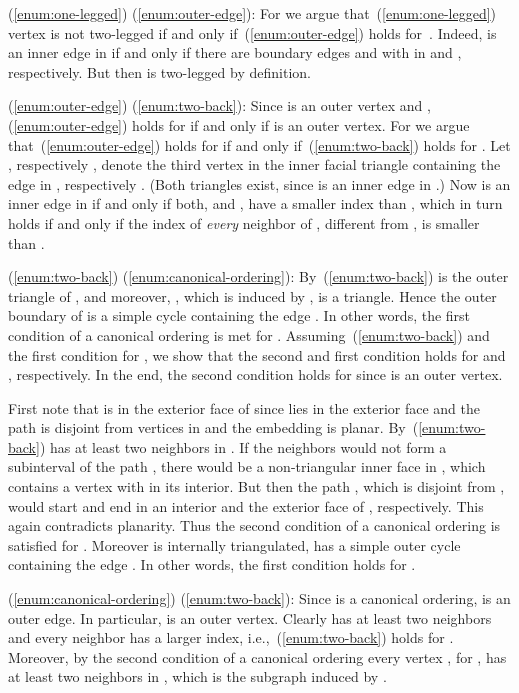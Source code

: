 \documentclass[11pt]{article}
\newenvironment{proof}{{\bf Proof:} }{\hspace*{\fill}\vspace{2mm}}
\begin{document}
\begin{proof}
  (\ref{enum:one-legged})  (\ref{enum:outer-edge}):
  For  we argue that~(\ref{enum:one-legged}) vertex 
	is not two-legged
	if and only if~(\ref{enum:outer-edge}) holds for~. Indeed,
   is an inner edge in  if and only if there are
  boundary edges  and  with  in
   and , respectively. But then 
	is two-legged by definition.

  (\ref{enum:outer-edge})  (\ref{enum:two-back}):
  Since  is an outer vertex and , (\ref{enum:outer-edge})
  holds for  if and only if  is an outer vertex. For
   we argue that~(\ref{enum:outer-edge}) holds for 
  if and only if~(\ref{enum:two-back}) holds for . Let ,
  respectively , denote the third vertex in the inner facial
  triangle containing the edge  in , respectively
  . (Both triangles exist, since  is an inner edge
  in .) Now  is an inner edge in  if and only
  if both,  and , have a smaller index than ,
  which in turn holds if and only if the index of \emph{every}
  neighbor of , different from , is smaller than .

  (\ref{enum:two-back})  (\ref{enum:canonical-ordering}):
  By~(\ref{enum:two-back})  is
  the outer triangle of , and moreover, , which is
  induced by , is a triangle. Hence the outer
  boundary of  is a simple cycle  containing the
  edge . In other words, the first condition of a canonical
  ordering is met for . Assuming~(\ref{enum:two-back}) and the
  first condition for , we show that the second and
  first condition holds for  and , respectively. In the end,
  the second condition holds for  since  is an outer
  vertex.

  First note that  is in the exterior face of 
  since  lies in the exterior face and the path 
  is disjoint from vertices in  and the embedding is
  planar. By~(\ref{enum:two-back})  has at least two neighbors in
  . If the neighbors would not form a subinterval of the path
  , there would be a non-triangular inner
  face in , which contains a vertex  with  in
  its interior. But then the path , which is disjoint
  from , would start and end in an interior and the
  exterior face of , respectively. This again contradicts
  planarity. Thus the second condition of a canonical ordering is
  satisfied for . Moreover  is internally
  triangulated, has a simple outer cycle  containing the edge
  . In other words, the first condition holds for .

  (\ref{enum:canonical-ordering})  (\ref{enum:two-back}):
  Since  is a canonical ordering,  is an outer edge. In
  particular,  is an outer vertex. Clearly  has at
  least two neighbors and every neighbor has a larger index,
  i.e.,~(\ref{enum:two-back}) holds for .  Moreover, by the second
  condition of a canonical ordering every vertex ,
  for , has at least two neighbors in , which is the subgraph induced by
  .


\end{proof}
\end{document}
